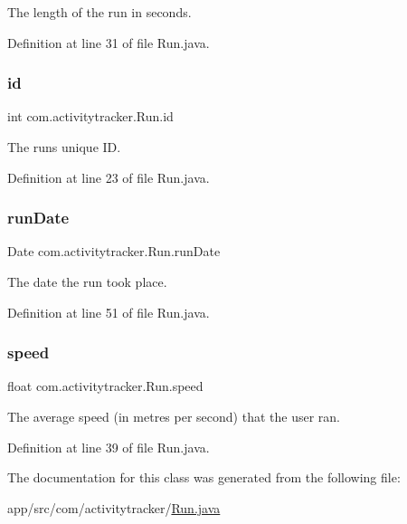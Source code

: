 The length of the run in seconds. 

Definition at line 31 of file Run.\+java.

\mbox{\label{classcom_1_1activitytracker_1_1_run_aa76717aee690b5bfe919d6e87dea1d84}} 
\subsubsection{\texorpdfstring{id}{id}}
{\footnotesize\ttfamily int com.\+activitytracker.\+Run.\+id\hspace{0.3cm}{\ttfamily [private]}}

The run\textquotesingle{}s unique ID. 

Definition at line 23 of file Run.\+java.

\mbox{\label{classcom_1_1activitytracker_1_1_run_a2f519da043ea384f1ba0d156f4971367}} 
\subsubsection{\texorpdfstring{runDate}{runDate}}
{\footnotesize\ttfamily Date com.\+activitytracker.\+Run.\+run\+Date\hspace{0.3cm}{\ttfamily [private]}}

The date the run took place. 

Definition at line 51 of file Run.\+java.

\mbox{\label{classcom_1_1activitytracker_1_1_run_ada0c6e189d55997133cde5bbe9913984}} 
\subsubsection{\texorpdfstring{speed}{speed}}
{\footnotesize\ttfamily float com.\+activitytracker.\+Run.\+speed\hspace{0.3cm}{\ttfamily [private]}}

The average speed (in metres per second) that the user ran. 

Definition at line 39 of file Run.\+java.



The documentation for this class was generated from the following file\+:\begin{DoxyCompactItemize}
\item 
app/src/com/activitytracker/\mbox{\hyperlink{_run_8java}{Run.\+java}}\end{DoxyCompactItemize}
